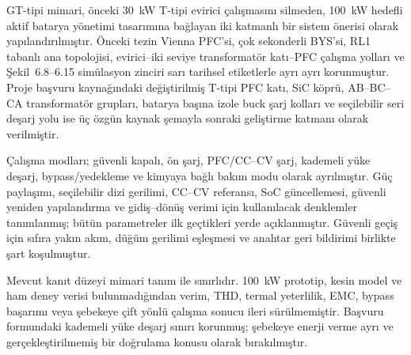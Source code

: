 GT-tipi mimari, önceki \SI{30}{\kilo\watt} T-tipi evirici çalışmasını silmeden, \SI{100}{\kilo\watt} hedefli aktif batarya yönetimi tasarımına bağlayan iki katmanlı bir sistem önerisi olarak yapılandırılmıştır. Önceki tezin Vienna PFC'si, çok sekonderli BYS'si, RL1 tabanlı ana topolojisi, evirici--iki seviye transformatör katı--PFC çalışma yolları ve Şekil~6.8--6.15 simülasyon zinciri sarı tarihsel etiketlerle ayrı ayrı korunmuştur. Proje başvuru kaynağındaki değiştirilmiş T-tipi PFC katı, SiC köprü, AB--BC--CA transformatör grupları, batarya başına izole buck şarj kolları ve seçilebilir seri deşarj yolu ise üç özgün kaynak şemayla sonraki geliştirme katmanı olarak verilmiştir.

Çalışma modları; güvenli kapalı, ön şarj, PFC/CC--CV şarj, kademeli yüke deşarj, bypass/yedekleme ve kimyaya bağlı bakım modu olarak ayrılmıştır. Güç paylaşımı, seçilebilir dizi gerilimi, CC--CV referansı, SoC güncellemesi, güvenli yeniden yapılandırma ve gidiş--dönüş verimi için kullanılacak denklemler tanımlanmış; bütün parametreler ilk geçtikleri yerde açıklanmıştır. Güvenli geçiş için sıfıra yakın akım, düğüm gerilimi eşleşmesi ve anahtar geri bildirimi birlikte şart koşulmuştur.

Mevcut kanıt düzeyi mimari tanım ile sınırlıdır. \SI{100}{\kilo\watt} prototip, kesin model ve ham deney verisi bulunmadığından verim, THD, termal yeterlilik, EMC, bypass başarımı veya şebekeye çift yönlü çalışma sonucu ileri sürülmemiştir. Başvuru formundaki kademeli yüke deşarj sınırı korunmuş; şebekeye enerji verme ayrı ve gerçekleştirilmemiş bir doğrulama konusu olarak bırakılmıştır.
